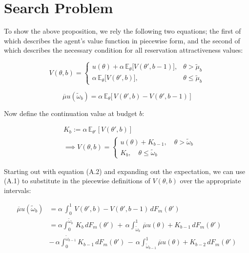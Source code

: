 \section{Search Problem}
\label{appx: b} 
To show the above proposition, we rely the following two equations; the first of which describes the agent's value function in piecewise form, and the second of which describes the necessary condition for all reservation attractiveness values:

\begin{equation}
    V(\theta, b)=\begin{cases} 
        u(\theta) +\alpha \,\mathbb{E}_{\theta}\Big[V(\theta', b-1)\Big],& \theta> \widetilde \mu_b \\
        \alpha \,\mathbb{E}_{\theta}\Big[V(\theta', b)\Big],& \theta\leq\widetilde \mu_b
    \end{cases}  
\end{equation}


\begin{equation}
    \overline\mu u(\widetilde\omega_b) = \alpha \, \mathbb{E}_\theta\Big[\,V(\theta',b)-V(\theta',b-1)\,\Big]  
\end{equation}
 
Now define the continuation value at budget $b$:

\begin{equation*}
    \begin{aligned}
        &K_{b}:=\alpha \,\mathbb{E}_{\theta'}\left[V(\theta', b)\right] \\
        &\implies V(\theta, b)=\begin{cases} 
            u(\theta) + K_{b-1},\quad \theta > \widetilde \omega_b \\  
            K_{b},\quad \theta \leq \widetilde \omega_b
        \end{cases}
    \end{aligned} 
\end{equation*}
 
Starting out with equation (A.2) and expanding out the expectation, we can use (A.1) to substitute in the piecewise definitions of $V(\theta,b)$ over the appropriate intervals:

\begin{equation*}
    \begin{aligned}
        \overline\mu u(\widetilde\omega_b) &= \alpha \,\int^1_0\,V(\theta',b)-V(\theta',b-1)\,dF_m(\theta')\\
        &=\alpha \int^{\widetilde\omega_b}_0\,K_b\,dF_m(\theta') \,+\, \alpha \int^1_{\widetilde\omega_b}\,\overline\mu u(\theta) + K_{b-1}\,dF_m(\theta')\\ 
        & -\,\alpha \int^{\widetilde\omega_{b-1}}_0 K_{b-1}\,dF_m(\theta') \,-\, \alpha \int^1_{\widetilde\omega_{b-1}} \overline\mu u(\theta) + K_{b-2}\,dF_m(\theta')\end{aligned}
\end{equation*}

